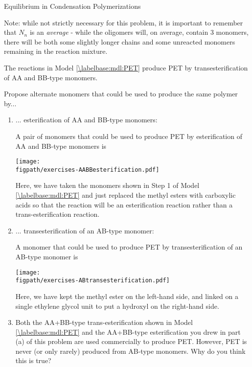\begin{activity}{Equilibrium in Condensation Polymerizations}
\begin{exercises}
\begin{solution}{}
				Note: while not strictly necessary for this problem, it is important to remember that $N_n$ is an \emph{average} - while the oligomers will, on average, contain 3 monomers, there will be both some slightly longer chains and some unreacted monomers remaining in the reaction mixture.
				
			\end{solution}
		
	
		\exercise The reactions in Model \ref{\labelbase:mdl:PET} produce PET by transesterification of AA and BB-type monomers.
		
			Propose alternate monomers that could be used to produce the same polymer by...
			
				\begin{enumerate}
					\item ... esterification of AA and BB-type monomers:
		
			\begin{solution}{}
				A pair of monomers that could be used to produce PET by esterification of AA and BB-type monomers is
		
		\centerline{\texttt{[image: \\figpath/exercises-AABBesterification.pdf]}}
		
				Here, we have taken the monomers shown in Step 1 of Model \ref{\labelbase:mdl:PET} and just replaced the methyl esters with carboxylic acids so that the reaction will be an esterification reaction rather than a trans-esterification reaction.
				
				
			\end{solution}
			
			\item ... transesterification of an AB-type monomer:
			
			\begin{solution}{}
		
				A monomer that could be used to produce PET by transesterification of an AB-type monomer is
		
		\centerline{\texttt{[image: \\figpath/exercises-ABtransesterification.pdf]}}
		
				Here, we have kept the methyl ester on the left-hand side, and linked on a single ethylene glycol unit to put a hydroxyl on the right-hand side.		
				
			\end{solution}
			
			\item Both the AA+BB-type trans-esterification shown in Model \ref{\labelbase:mdl:PET} and the AA+BB-type esterification you drew in part (a) of this problem are used commercially to produce PET.  However, PET is never (or only rarely) produced from AB-type monomers.  Why do you think this is true?
			

\end{enumerate}
\end{exercises}
\end{activity}
